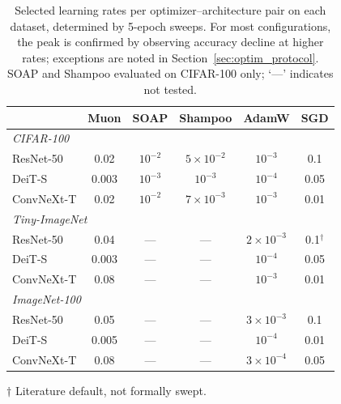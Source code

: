 \begin{table}[h]
\centering
\caption{Selected learning rates per optimizer--architecture pair on each dataset, determined by 5-epoch sweeps. For most configurations, the peak is confirmed by observing accuracy decline at higher rates; exceptions are noted in Section~\ref{sec:optim_protocol}. SOAP and Shampoo evaluated on CIFAR-100 only; `---' indicates not tested.}
\label{tab:lr_selected}
\small
\begin{tabular}{lccccc}
\toprule
& \textbf{Muon} & \textbf{SOAP} & \textbf{Shampoo} & \textbf{AdamW} & \textbf{SGD} \\
\midrule
\multicolumn{6}{l}{\textit{CIFAR-100}} \\
ResNet-50   & 0.02  & $10^{-2}$ & $5 \times 10^{-2}$ & $10^{-3}$ & 0.1  \\
DeiT-S      & 0.003 & $10^{-3}$          & $10^{-3}$          & $10^{-4}$ & 0.05 \\
ConvNeXt-T  & 0.02  & $10^{-2}$          & $7 \times 10^{-3}$ & $10^{-3}$ & 0.01 \\
\midrule
\multicolumn{6}{l}{\textit{Tiny-ImageNet}} \\
ResNet-50   & 0.04  & --- & --- & $2 \times 10^{-3}$ & 0.1$^\dagger$ \\
DeiT-S      & 0.003 & --- & --- & $10^{-4}$          & 0.05 \\
ConvNeXt-T  & 0.08  & --- & --- & $10^{-3}$          & 0.01 \\
\midrule
\multicolumn{6}{l}{\textit{ImageNet-100}} \\
ResNet-50   & 0.05  & --- & --- & $3 \times 10^{-3}$ & 0.1  \\
DeiT-S      & 0.005 & --- & --- & $10^{-4}$          & 0.01 \\
ConvNeXt-T  & 0.08  & --- & --- & $3 \times 10^{-4}$ & 0.05 \\
\bottomrule
\end{tabular}
\vspace{0.3em}
\par\noindent\footnotesize{$\dagger$ Literature default, not formally swept.}
\end{table}
